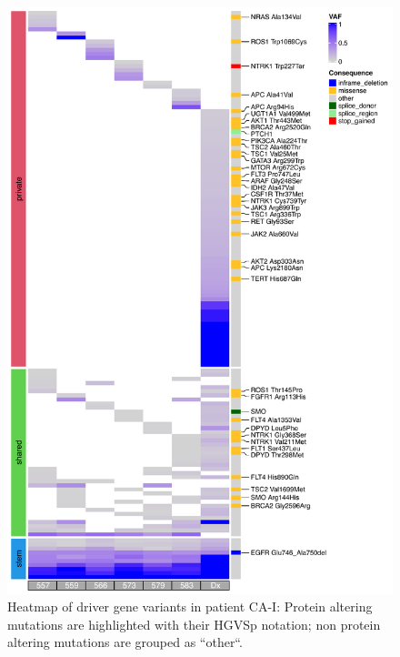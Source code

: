 \begin{figure}[ht]
\centering
\includegraphics[width=.99\linewidth]{Figures/CASCADE/CA51/CA51varHeatmap.pdf}
\caption[Heatmap of driver gene variants in patient CA-I]{Heatmap of driver gene variants in patient CA-I: Protein altering mutations are highlighted with their HGVSp notation; non protein altering mutations are grouped as ``other``.} \label{fig:cas51heatmap}
\end{figure}



